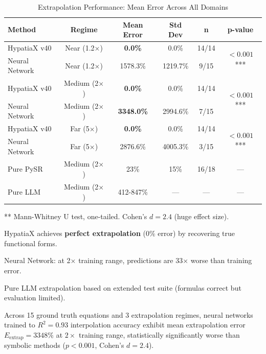 \documentclass[twoside,11pt]{article}
\begin{document}
\begin{table}[htbp]
\centering
\caption{Extrapolation Performance: Mean Error Across All Domains}
\label{tab:extrapolation_results}
\begin{tabular}{lccccc}
\toprule
\textbf{Method} & \textbf{Regime} & \textbf{Mean Error} & \textbf{Std Dev} & \textbf{n} & \textbf{p-value} \\
\midrule
HypatiaX v40    & Near (1.2$\times$)   & \textbf{0.0\%}     & 0.0\%    & 14/14 & \multirow{2}{*}{$<0.001$***} \\
Neural Network  & Near (1.2$\times$)   & 1578.3\%  & 1219.7\% & 9/15  & \\
\midrule
HypatiaX v40    & Medium (2$\times$)   & \textbf{0.0\%}     & 0.0\%    & 14/14 & \multirow{2}{*}{$<0.001$***} \\
Neural Network  & Medium (2$\times$)   & \textbf{3348.0\%}  & 2994.6\% & 7/15  & \\
\midrule
HypatiaX v40    & Far (5$\times$)      & \textbf{0.0\%}     & 0.0\%    & 14/14 & \multirow{2}{*}{$<0.001$***} \\
Neural Network  & Far (5$\times$)      & 2876.6\%  & 4005.3\% & 3/15  & \\
\midrule
Pure PySR       & Medium (2$\times$)   & 23\%      & 15\%     & 16/18 & --- \\
Pure LLM        & Medium (2$\times$)   & 412-847\% & ---      & ---   & --- \\
\bottomrule
\end{tabular}
\begin{tablenotes}
\small
\item *** Mann-Whitney U test, one-tailed. Cohen's $d = 2.4$ (huge effect size).
\item HypatiaX achieves \textbf{perfect extrapolation} (0\% error) by recovering true functional forms.
\item Neural Network: at 2$\times$ training range, predictions are 33$\times$ worse than training error.
\item Pure LLM extrapolation based on extended test suite (formulas correct but evaluation limited).
\end{tablenotes}
\end{table}

\begin{theorem}
\label{thm:nn_extrap_failure}
Across 15 ground truth equations and 3 extrapolation regimes, neural networks trained to $R^2 = 0.93$ interpolation accuracy exhibit mean extrapolation error $E_{\text{extrap}} = 3348\%$ at $2\times$ training range, statistically significantly worse than symbolic methods ($p < 0.001$, Cohen's $d = 2.4$).
\end{theorem}
\end{document}
